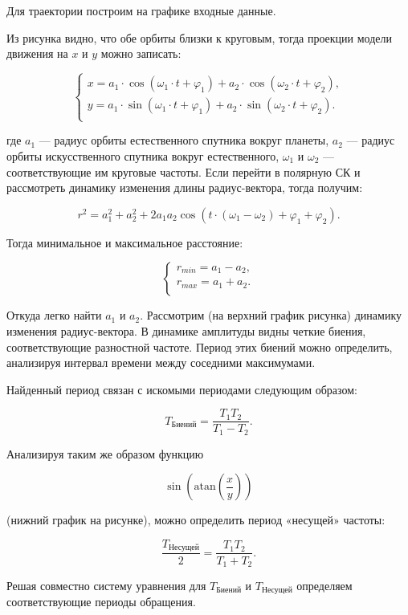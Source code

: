 \solutionSection

Для траектории построим на графике входные данные.


Из рисунка видно, что обе орбиты близки к круговым, тогда проекции модели движения на $x$ и $y$ можно записать:

$$ \left\{
\begin{aligned}
x = a_1 \cdot \cos(\omega_1\cdot t + \varphi_1)  + a_2 \cdot \cos(\omega_2\cdot t + \varphi_2), \\
y = a_1 \cdot \sin(\omega_1\cdot t + \varphi_1)  + a_2 \cdot \sin(\omega_2\cdot t + \varphi_2). \\
\end{aligned}
\right. $$

где $a_1$ — радиус орбиты естественного спутника вокруг планеты, $a_2$ — радиус орбиты искусственного спутника вокруг естественного, $\omega_1$ и $\omega_2$ — соответствующие им круговые частоты. Если перейти в полярную СК и рассмотреть динамику изменения длины радиус-вектора, тогда получим:

$$r^2 = a_1^2+a_2^2 + 2a_1a_2\cos(t\cdot (\omega_1 - \omega_2) + \varphi_1 + \varphi_2).$$
 
Тогда минимальное и максимальное расстояние:

$$ \left\{
\begin{aligned}
r_{min} = a_1 - a_2, \\
r_{max} = a_1 + a_2. \\
\end{aligned}
\right. $$

Откуда легко найти $a_1$ и $a_2$.
Рассмотрим (на верхний график рисунка) динамику изменения радиус-вектора. В динамике амплитуды видны четкие биения, соответствующие разностной частоте. Период этих биений можно определить, анализируя интервал времени между соседними максимумами.


Найденный период связан с искомыми периодами следующим образом:

$$T_\text{Биений} = \frac{T_1T_2}{T_1 - T_2}.$$

Анализируя таким же образом функцию 

$$\sin\left(\text{atan}\left(\frac{x}{y}\right)\right)$$ 

(нижний график на рисунке), можно определить период «несущей» частоты:

$$\frac{T_\text{Несущей}}{2} = \frac{T_1T_2}{T_1 + T_2}.$$

Решая совместно систему уравнения для $T_\text{Биений}$ и $T_\text{Несущей}$ определяем соответствующие периоды обращения.



